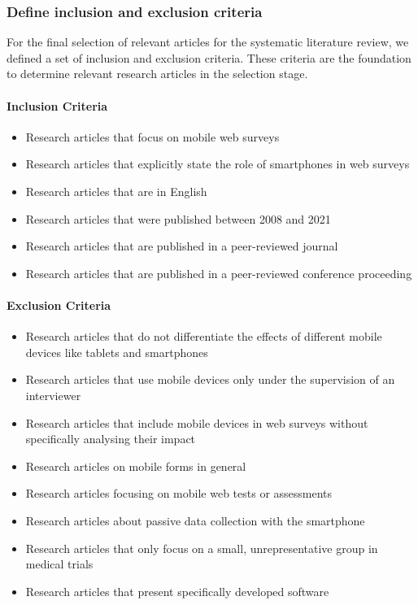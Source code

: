 \subsubsection{Define inclusion and exclusion criteria}
\label{subsec: Inclusion and Exclusion Criteria}

For the final selection of relevant articles for the systematic literature review, we defined a set of inclusion and exclusion criteria. These criteria are the foundation to determine relevant research articles in the selection stage.

\paragraph{Inclusion Criteria}
\begin{itemize}
    \item Research articles that focus on mobile web surveys
    \item Research articles that explicitly state the role of smartphones in web surveys
    \item Research articles that are in English
    \item Research articles that were published between 2008 and 2021
    \item Research articles that are published in a peer-reviewed journal
    \item Research articles that are published in a peer-reviewed conference proceeding
\end{itemize}

\paragraph{Exclusion Criteria}
\begin{itemize}
    \item Research articles that do not differentiate the effects of different mobile devices like tablets and smartphones
    \item Research articles that use mobile devices only under the supervision of an interviewer
    \item Research articles that include mobile devices in web surveys without specifically analysing their impact
    \item Research articles on mobile forms in general
    \item Research articles focusing on mobile web tests or assessments
    \item Research articles about passive data collection with the smartphone
    \item Research articles that only focus on a small, unrepresentative group in medical trials
    \item Research articles that present specifically developed software
\end{itemize}

